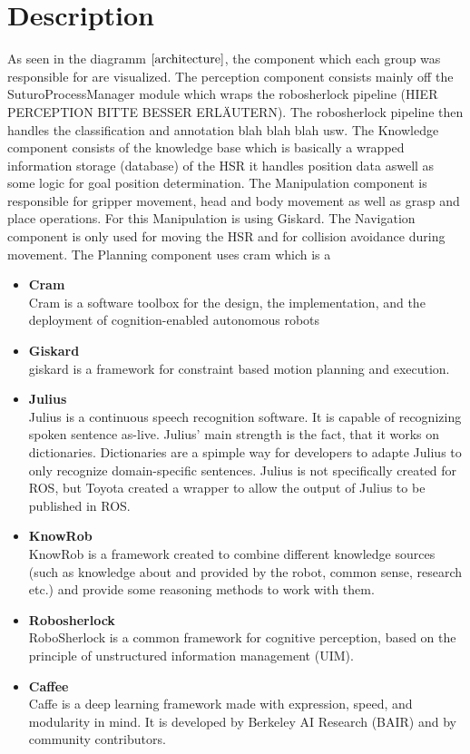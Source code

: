 \documentclass[main.tex]{subfiles}
\begin{document}
		\section{Description}
			As seen in the diagramm \(\ref{architecture}\), the component which each group was responsible for are visualized. The perception component consists mainly off the SuturoProcessManager module which wraps the robosherlock pipeline (HIER PERCEPTION BITTE BESSER ERLÄUTERN). The robosherlock pipeline then handles the classification and annotation blah blah blah usw. The Knowledge component consists of the knowledge base which is basically a wrapped information storage (database) of the HSR it handles position data aswell as some logic for goal position determination. The Manipulation component is responsible for gripper movement, head and body movement as well as grasp and place operations. For this Manipulation is using Giskard. The Navigation component is only used for moving the HSR and for collision avoidance during movement. The Planning component uses cram which is a 
			\begin{itemize}
				\item{\textbf{Cram}} \\
					 Cram is a software toolbox for the design, the implementation, and the deployment of cognition-enabled autonomous robots
				\item{\textbf{Giskard}} \\
					giskard is a  framework for constraint based motion planning and execution.
				\item{\textbf{Julius}} \\
					Julius is a continuous speech recognition software. It is capable of recognizing spoken sentence as-live. Julius' main strength is the fact, that it works on dictionaries. Dictionaries are a spimple way for developers to adapte Julius to only recognize domain-specific sentences. Julius is not specifically created for ROS, but Toyota created a wrapper to allow the output of Julius to be published in ROS.
				\item{\textbf{KnowRob}} \\
				    KnowRob is a framework created to combine different knowledge sources (such as knowledge about and provided by the robot, common sense, research etc.) and provide some reasoning methods to work with them. 
				\item{\textbf{Robosherlock}} \\
					RoboSherlock is a common framework for cognitive perception, based on the principle of unstructured information management (UIM).
				\item{\textbf{Caffee}} \\
					Caffe is a deep learning framework made with expression, speed, and modularity in mind. It is developed by Berkeley AI Research (BAIR) and by community contributors.

			\end{itemize}
		
\end{document}
